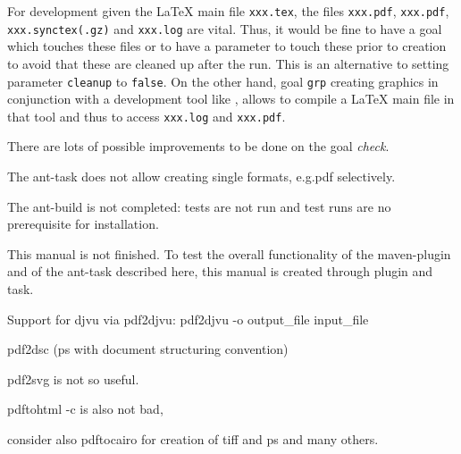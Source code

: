 For development given the \LaTeX{} main file \texttt{xxx.tex}, 
the files \texttt{xxx.pdf}, \texttt{xxx.pdf}, \texttt{xxx.synctex(.gz)} %
and \texttt{xxx.log} are vital. 
Thus, it would be fine to have a goal which touches these files 
or to have a parameter to touch these prior to creation 
to avoid that these are cleaned up after the run. 
This is an alternative to setting parameter \texttt{cleanup} to \texttt{false}. 
On the other hand, goal \texttt{grp} creating graphics 
in conjunction with a development tool like , 
allows to compile a \LaTeX{} main file in that tool 
and thus to access \texttt{xxx.log} and \texttt{xxx.pdf}. 

There are lots of possible improvements to be done on the goal \emph{check}. 


The ant-task does not allow creating single formats, e.g.\@ pdf selectively. 

The ant-build is not completed: tests are not run and 
test runs are no prerequisite for installation. 

This manual is not finished. 
To test the overall functionality of the maven-plugin and of the ant-task 
described here, this manual is created through plugin and task. 

Support for djvu via pdf2djvu: 
pdf2djvu -o output\_file input\_file

pdf2dsc
(ps with document structuring convention) 

pdf2svg is not so useful. 

pdftohtml -c is also not bad, 

consider also pdftocairo for creation of tiff and ps and many others. 
